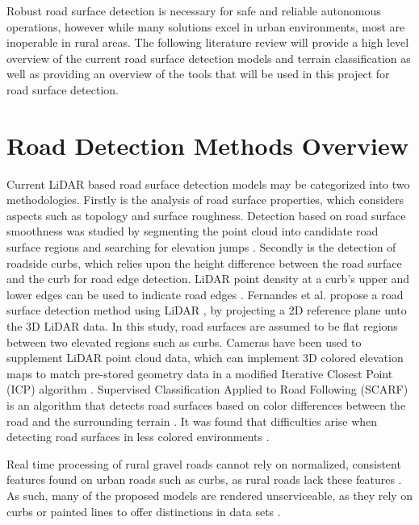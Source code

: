 \documentclass[numbered,pdftex]{ohio-etd}
\begin{document}
{		{Robust road surface detection is necessary for safe and reliable autonomous operations, however while many solutions excel in urban environments, most are inoperable in rural areas. The following literature review will provide a high level overview of the current road surface detection models and terrain classification as well as providing an overview of the tools that will be used in this project for road surface detection.}
		
	\section{Road Detection Methods Overview}{
	
		{Current LiDAR based road surface detection models may be categorized into two methodologies. Firstly is the analysis of road surface properties, which considers aspects such as topology and surface roughness. Detection based on road surface smoothness was studied by segmenting the point cloud into candidate road surface regions and searching for elevation jumps \cite{liu_new_2013}. Secondly is the detection of roadside curbs, which relies upon the height difference between the road surface and the curb for road edge detection. LiDAR point density at a curb's upper and lower edges can be used to indicate road edges \cite{ibrahim_curb-based_2012}. Fernandes et al. propose a road surface detection method using LiDAR \cite{fernandes_road_2014}, by projecting a 2D reference plane unto the 3D LiDAR data. In this study, road surfaces are assumed to be flat regions between two elevated regions such as curbs. Cameras have been used to supplement LiDAR point cloud data, which can implement 3D colored elevation maps to match pre-stored geometry data in a modified Iterative Closest Point (ICP) algorithm \cite{manz_detection_2011}. Supervised Classification Applied to Road Following (SCARF) is an algorithm that detects road surfaces based on color differences between the road and the surrounding terrain \cite{crisman_scarf_1993}. It was found that difficulties arise when detecting road surfaces in less colored environments \cite{crisman_scarf_1993,manz_detection_2011}.}
		
		{Real time processing of rural gravel roads cannot rely on normalized, consistent features found on urban roads such as curbs, as rural roads lack these features \cite{skorseth_gravel_nodate}. As such, many of the proposed models are rendered unserviceable, as they rely on curbs or painted lines to offer distinctions in data sets \cite{yadav_extraction_2017,liu_new_2013,qiu_fast_2016,fernandes_road_2014,seker_experiments_nodate,yang_semi-automated_2013,miyazaki_line-based_2014,hervieu_road_2013,smadja_road_nodate}.} 
		
}}
\end{document}
